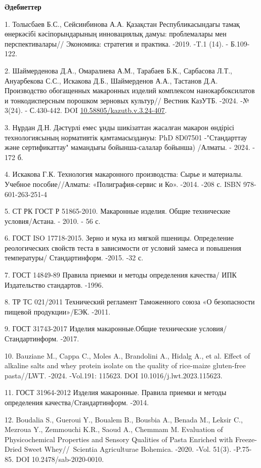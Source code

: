 \begin{center}
{\bfseries Әдебиеттер}
\end{center}

\begin{refs}
1. Толысбаев Б.С., Сейсинбинова А.А. Қазақстан Республикасындағы тамақ
өнеркәсібі кәсіпорындарының инновациялық дамуы: проблемалары мен
перспективалары// Экономика: стратегия и практика. -2019. -T.1 (14). -
Б.109-122.

2. Шаймерденова Д.А., Омаралиева А.М., Тарабаев Б.К., Сарбасова Л.Т.,
Ануарбекова С.С., Искакова Д.Б., Шаймерденов А.А., Тастанов Д.А.
Производство обогащенных макаронных изделий комплексом нанокарбоксилатов
и тонкодисперсным порошком зерновых культур// Вестник КазУТБ. -2024. -№
3(24). - С.430-442. DOI
\href{https://doi.org/10.58805/kazutb.v.3.24-407}{10.58805/kazutb.v.3.24-407}.

3. Нұрдан Д.Н. Дәстүрлі емес ұнды шикізаттан жасалған макарон өндірісі
технологиясының нормативтік қамтамасыздануы: PhD 8D07501 -"Стандарттау
және сертификаттау" мамандығы бойынша-салалар бойынша) /Алматы. - 2024.
- 172 б.

4. Искакова Г.К. Технология макаронного производства: Сырье и материалы.
Учебное пособие//Алматы: «Полиграфия-сервис и Ко». -2014. -208 с. ISBN
978-601-263-251-4

5. СТ РК ГОСТ Р 51865-2010. Макаронные изделия. Общие технические
условия/Астана. - 2010. - 56 с.

6. ГОСТ ISO 17718-2015. Зерно и мука из мягкой пшеницы. Определение
реологических свойств теста в зависимости от условий замеса и повышения
температуры/ Стандартинформ. -2015. -32 с.

7. ГОСТ 14849-89 Правила приемки и методы определения качества/ ИПК
Издательство стандартов. -1996.

8. ТР ТС 021/2011 Технический регламент Таможенного союза «О безопасности
пищевой продукции»/ЕЭК. -2011.

9. ГОСТ 31743-2017 Изделия макаронные.Общие технические
условия/Стандартинформ. -2017.

10. Bauziane M., Cappa C., Moles A., Brandolini A., Hidalg A., et al.
Effect of alkaline salts and whey protein isolate on the quality of
rice-maize gluten-free pasta//LWT. -2024. -Vol.191: 115623. DOI
10.1016/j.lwt.2023.115623.

11. ГОСТ 31964-2012 Изделия макаронные. Правила приемки и методы
определения качества/Стандартинформ. -2014.

12. Boudalia S., Gueroui Y., Boualem B., Bousbia A., Benada M., Leksir
C., Mezroua Y., Zemmouchi K.R., Saoud A., Chemmam M. Evaluation of
Physicochemical Properties and Sensory Qualities of Pasta Enriched with
Freeze-Dried Sweet Whey//~Scientia Agriculturae Bohemica. -2020. -Vol.
51(3). -P.75- 85. DOI 10.2478/sab-2020-0010.


\end{refs}
